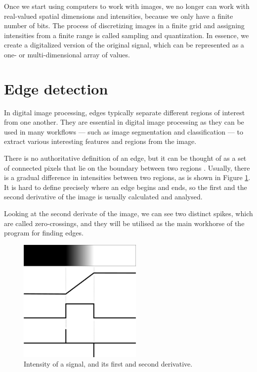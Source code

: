 \documentclass[
  digital,     %
  oneside,     %
  nosansbold,  %
  nocolorbold, %
  lof,         %
  lot,         %
]{fithesis4}
\begin{document}
Once we start using computers to work with images, we no longer can work with
real-valued spatial dimensions and intensities, because we only have a finite
number of bits. The process of discretizing images in a finite grid and assigning
intensities from a finite range is called sampling and quantization. In essence,
we create a digitalized version of the original signal, which can be represented
as a one- or \mbox{multi-dimensional} array of values.

\section{Edge detection}

In digital image processing, edges typically separate different regions of
interest from one another. They are essential in digital image processing
as they can be used in many workflows --- such as image segmentation and
classification --- to extract various interesting features and regions
from the image.

There is no authoritative definition of an edge, but it can be thought of as a
set of connected pixels that lie on the boundary between two regions
\cite{gonzalez2002}. Usually, there is a gradual difference in intensities
between two regions, as is shown in Figure \ref{fig:edge_intensities}. It is
hard to define precisely where an edge begins and ends, so the first and the
second derivative of the image is usually calculated and analysed.

Looking at the second derivate of the image, we can see two distinct spikes,
which are called zero-crossings, and they will be utilised as the main workhorse
of the program for finding edges.

\begin{figure}
    \begin{center}
        \includegraphics[width=6cm]{resources/inkscape/gradient.png}
    \end{center}
    \caption{Intensity of a signal, and its first and second derivative.}
    \label{fig:edge_intensities}
\end{figure}
\end{document}
